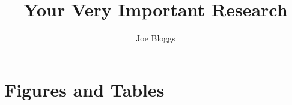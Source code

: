 \documentclass[
        cclicense,
        spacing = double,
    ]{UoBThesis}
\title{Your Very Important Research}
\author{Joe Bloggs}
\begin{document}
\frontmatter

\maketitle

\tableofcontents

\chapter{Figures and Tables}

\listoffigures

\listoftables

\mainmatter





\appendix

\blinddocument

\backmatter

\nocite{*}
\printbibliography
\end{document}
